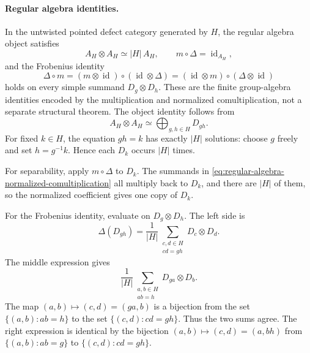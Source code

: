 \paragraph{Regular algebra identities.}
In the untwisted pointed defect category generated by \(H\), the regular
algebra object satisfies
\begin{equation}
  A_H\otimes A_H\simeq |H|\,A_H,
  \qquad
  m\circ\Delta=\operatorname{id}_{A_H},
  \label{eq:regular-algebra-object-and-separability}
\end{equation}
and the Frobenius identity
\begin{equation}
  \Delta\circ m
  =
  (m\otimes\operatorname{id})\circ
  (\operatorname{id}\otimes\Delta)
  =
  (\operatorname{id}\otimes m)\circ
  (\Delta\otimes\operatorname{id})
  \label{eq:regular-algebra-frobenius-identity}
\end{equation}
holds on every simple summand \(D_g\otimes D_h\).
These are the finite group-algebra identities encoded by the multiplication
and normalized comultiplication, not a separate structural theorem.  The
object identity follows from
\[
  A_H\otimes A_H
  \simeq
  \bigoplus_{g,h\in H}D_{gh}.
\]
For fixed \(k\in H\), the equation \(gh=k\) has exactly \(|H|\) solutions:
choose \(g\) freely and set \(h=g^{-1}k\).  Hence each \(D_k\) occurs
\(|H|\) times.

For separability, apply \(m\circ\Delta\) to \(D_k\).  The summands in
\eqref{eq:regular-algebra-normalized-comultiplication} all multiply back to
\(D_k\), and there are \(|H|\) of them, so the normalized coefficient gives
one copy of \(D_k\).

For the Frobenius identity, evaluate on \(D_g\otimes D_h\).  The left side is
\[
  \Delta(D_{gh})
  =
  \frac1{|H|}
  \sum_{\substack{c,d\in H\\ cd=gh}}D_c\otimes D_d .
\]
The middle expression gives
\[
  \frac1{|H|}
  \sum_{\substack{a,b\in H\\ ab=h}}D_{ga}\otimes D_b .
\]
The map \((a,b)\mapsto(c,d)=(ga,b)\) is a bijection from the set
\(\{(a,b):ab=h\}\) to the set \(\{(c,d):cd=gh\}\).  Thus the two sums agree.
The right expression is identical by the bijection
\((a,b)\mapsto(c,d)=(a,bh)\) from \(\{(a,b):ab=g\}\) to
\(\{(c,d):cd=gh\}\).

